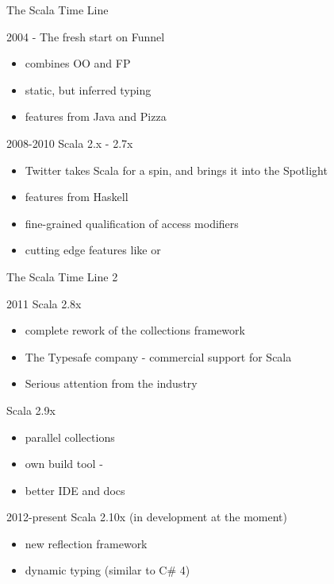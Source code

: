 \begin{frame}{The Scala Time Line}
\begin{block}{2004}
 - The fresh start on Funnel
\begin{itemize}
  \item combines OO and FP
  \item static, but inferred typing
  \item features from Java and Pizza
\end{itemize}
\end{block}
\pause
\begin{block}{2008-2010}
Scala 2.x - 2.7x
\begin{itemize}
  \item Twitter takes Scala for a spin, and brings it into the Spotlight
  \item features from Haskell
  \item fine-grained qualification of access modifiers
  \item cutting edge features like  or
\end{itemize}
\end{block}
\end{frame}

\begin{frame}{The Scala Time Line 2}
\begin{block}{2011}
Scala 2.8x
\begin{itemize}
  \item complete rework of the collections framework
  \item The Typesafe company - commercial support for Scala
  \item Serious attention from the industry
\end{itemize}
Scala 2.9x
\begin{itemize}
  \item parallel collections
  \item own build tool - 
  \item better IDE and docs
\end{itemize}
\end{block}
\pause
\begin{block}{2012-present}
Scala 2.10x (in development at the moment)
\begin{itemize}
  \item new reflection framework
  \item dynamic typing (similar to C\# 4)
\end{itemize}
\end{block}
\end{frame}

